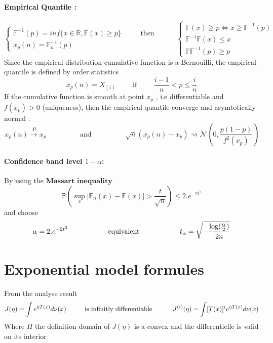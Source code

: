 \documentclass[a4paper,10pt]{article}
\begin{document}
\paragraph{Empirical Quantile : }
\[
\left\{
\begin{array}{l}
\mathbb{F}^{-1}(p) = inf \{ x \in \mathbb{R} , \mathbb{F}(x) \geq p \} \hspace{1cm} \text{ then } \\
x_p(n) = \mathbb{F}_n^{-1}(p)
\end{array}\right.
\hspace{1cm}
\left\{
\begin{array}{l}
 \mathbb{F}(x) \geq p \Longleftrightarrow x \geq \mathbb{F}^{-1}(p) \\
 \mathbb{F}^{-1}\mathbb{F}(x) \leq x   \\
 \mathbb{F}\mathbb{F}^{-1}(p) \geq p   
\end{array}\right. 
\]
Since the empirical distribution cumulative function is a Bernouilli, the empirical quantile is defined by order statistics
\[
x_p(n) = X_{(i)} \hspace{1cm} \text{if} \hspace{1cm} \frac{i-1}{n} < p \leq \frac{i}{n}
\]
If the cumulative function is smooth at point $x_p$ , i.e differentiable and $f(x_p)>0$ (uniqueness), then the empirical quantile converge and asymtotically normal :
\[
x_p(n) \xrightarrow{P} x_p 
\hspace{2cm} \text{and} \hspace{2cm} 
\sqrt{n}(x_p(n) - x_p ) \rightsquigarrow   \mathcal{N}(0,\frac{p(1-p)}{f^2(x_p)} )
\]
\paragraph{Confidence band level $1-\alpha$: }
By using the $\textbf{Massart inequality}$
\[
\mathbb{P}( \sup_{x} | \mathbb{F}_n(x) -  \mathbb{F}(x) | > \frac{t}{\sqrt{n}} ) \leq 2.e^{-2t^2}
\]
and choose 
\[
\alpha =  2.e^{-2t^2} \hspace{20mm} \text{equivalent} \hspace{20mm} t_{\alpha} = \sqrt{ -\frac{\text{log}(\frac{\alpha}{2})}{2n} }
\]

\section{Exponential model formules}
From the analyse result
\[
J(\eta)=\int e^{\eta T(x)} d\nu(x) 
\hspace{10mm} \text{is infinitly differentiable } \hspace{10mm}
J^{(i)}(\eta)=\int [T(x)]^i e^{\eta T(x)} d\nu(x) 
\]
Where $H$ the definition domain of $J(\eta)$ is a convex and the differentielle is valid on its interior
\end{document}
